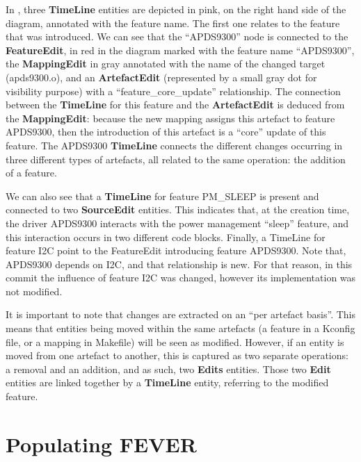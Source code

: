 \begin{sloppypar}

In , three \textbf{TimeLine} entities are depicted in pink, on the right hand side of the diagram, annotated with the feature name.
The first one relates to the feature that was introduced. We can see that
the ``APDS9300'' node is connected to the \textbf{FeatureEdit}, in red in the diagram marked with the feature name ``APDS9300'', the \textbf{MappingEdit} in gray annotated with the name of the changed target (apds9300.o), and an \textbf{ArtefactEdit} (represented by a small gray dot for visibility purpose) with a ``feature\_core\_update'' relationship.
The connection between the \textbf{TimeLine} for this feature and the \textbf{ArtefactEdit} is deduced from the \textbf{MappingEdit}:
because the new mapping assigns this artefact to feature APDS9300, then the introduction of this artefact is a ``core'' update of this feature.
The APDS9300 \textbf{TimeLine} connects the different changes occurring in three different types of artefacts, all related to the same operation: the addition of a feature.

We can also see that a \textbf{TimeLine} for feature PM\_SLEEP is present and connected to two \textbf{SourceEdit} entities.
This indicates that, at the creation time, the driver APDS9300 interacts with the power management ``sleep'' feature,
and this interaction occurs in two different code blocks.
Finally, a TimeLine for feature I2C point to the FeatureEdit introducing feature APDS9300.
Note that, APDS9300 depends on I2C, and that relationship is new. For that reason, in this commit
the influence of feature I2C was changed, however its implementation was not modified.

\end{sloppypar}

It is important to note that changes are extracted on an ``per artefact basis''.
This means that entities being moved within the same artefacts (a feature in a Kconfig file, or a mapping in Makefile) will be seen as modified. 
However, if an entity is moved from one artefact to another, this is captured as two separate operations: a removal and an addition, and as such, two \textbf{Edits} entities. 
Those two \textbf{Edit} entities are linked together by a \textbf{TimeLine} entity, referring to the modified feature.


\section{Populating FEVER}
\label{sec:extraction}

